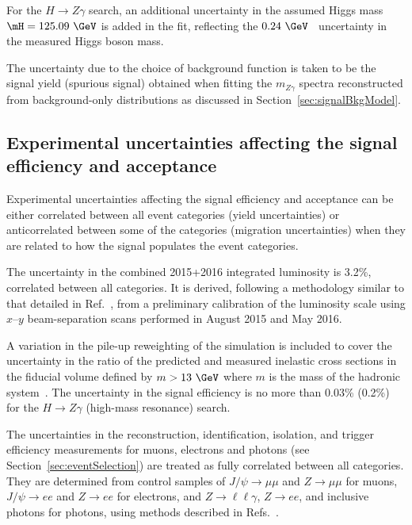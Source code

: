 For the $H\to Z\gamma$ search, an additional uncertainty in the assumed Higgs mass $\mH = 125.09~\GeV$ is
added in the fit, reflecting the $0.24~\GeV$~\cite{higgs-mass} uncertainty in the measured Higgs boson mass.

The uncertainty due to the choice of background function is taken to be the signal yield 
(spurious signal) obtained
when fitting the $m_{Z\gamma}$ spectra reconstructed from background-only distributions
as discussed in Section~\ref{sec:signalBkgModel}.



\subsection{Experimental uncertainties affecting the signal efficiency and acceptance}
\label{sec:uncyield}

Experimental uncertainties affecting the signal efficiency and acceptance 
can be either correlated between all event
categories (yield uncertainties) or anticorrelated between some of the categories 
(migration uncertainties) when they are related to how the signal populates the event categories.

The uncertainty in the combined 2015+2016 integrated luminosity is 3.2\%, 
correlated between all categories. It is derived, 
following a methodology similar to that detailed in Ref.~\cite{Aaboud:2016hhf}, from a preliminary 
calibration 
of the luminosity scale using $x$--$y$ beam-separation scans performed in August 2015 and May 2016.

A variation in the pile-up reweighting of the simulation is included to cover the uncertainty 
in the ratio of the predicted and measured inelastic cross sections in the fiducial volume 
defined by $m > 13~\GeV$ where $m$ is the mass of the hadronic 
system~\cite{Aaboud:2016mmw}. The uncertainty in the signal efficiency is no more than 
0.03\% (0.2\%)
for the $H\to Z\gamma$ (high-mass resonance) search.

The uncertainties in the reconstruction, identification, isolation, and trigger efficiency measurements
for muons, electrons and photons (see Section~\ref{sec:eventSelection}) are treated as fully 
correlated between all categories. They are determined from control samples of $J/\psi\to\mu\mu$
and $Z\to\mu\mu$ for muons, $J/\psi\to ee$ and $Z\to ee$ for electrons, and $Z\to\ell\ell\gamma$,
$Z\to ee$, and inclusive photons for photons, using methods described in 
Refs.~\cite{Aad:2016jkr, ATLAS-electrons, ATLAS-photonid}.

